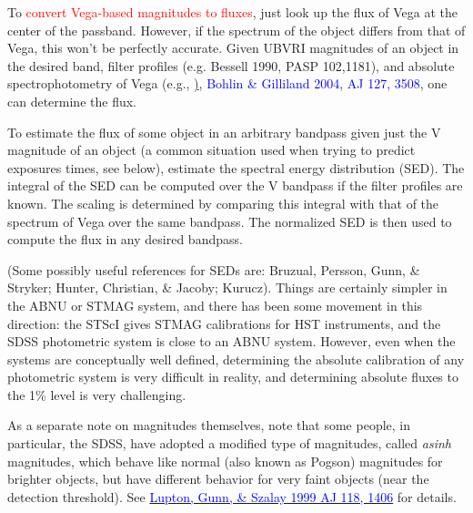 \documentclass[12pt]{article}
\begin{document}
To \textcolor{red}{convert Vega-based magnitudes to fluxes},
just look up the flux of Vega at the center of the passband.
However, if the spectrum of the object
differs from that of Vega, this won't be perfectly accurate.
Given UBVRI magnitudes of an object in the desired band, filter profiles
(e.g. Bessell 1990, PASP 102,1181), and absolute spectrophotometry of
Vega (e.g., \href{http://adsabs.harvard.edu/abs/2004AJ....127.3508B}),
{\textcolor{blue}{Bohlin \& Gilliland 2004, AJ 127, 3508}},
one can determine the flux.

To estimate the flux of some object in
an arbitrary bandpass given just the V magnitude of an object (a common
situation used when trying to predict exposures times, see below),
estimate the spectral energy distribution (SED).
The integral of the SED can be computed over the V bandpass if the
filter profiles are known.
The scaling is determined by comparing this integral with that of
the spectrum of Vega over the same bandpass.
The normalized SED is then used to compute the flux in any
desired bandpass.

(Some possibly useful references for SEDs are:
Bruzual, Persson, Gunn, \& Stryker; Hunter, Christian, \& Jacoby;
Kurucz). Things are certainly simpler in the ABNU or STMAG system, and
there has been some movement in this direction: the STScI gives STMAG
calibrations for HST instruments, and the SDSS photometric system is
close to an ABNU system.
However, even when the systems are conceptually
well defined, determining the absolute calibration of any photometric
system is very difficult in reality, and determining absolute fluxes
to the 1\% level is very challenging.

As a separate note on magnitudes themselves, note that some
people, in particular, the SDSS, have adopted a modified type of
magnitudes, called \emph{asinh} magnitudes, which behave like normal (also
known as Pogson) magnitudes for brighter objects, but have different
behavior for very faint objects (near the detection threshold). See
\href{http://adsabs.harvard.edu/abs/1999AJ....118.1406L}
{\textcolor{blue}{Lupton, Gunn, \& Szalay 1999 AJ 118, 1406}}
for details.
\end{document}
